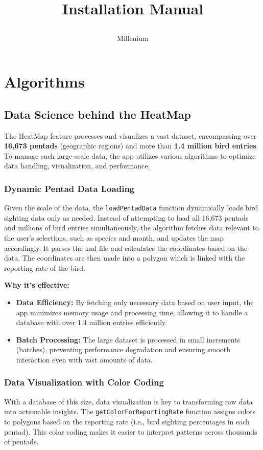 \documentclass{article}
\title{

\\
{Installation Manual}
}
\author{Millenium}
\begin{document}
\tableofcontents

\newpage

\section{Algorithms}
\subsection{Data Science behind the HeatMap}

The HeatMap feature processes and visualizes a vast dataset, encompassing over \textbf{16,673 pentads} (geographic regions) and more than \textbf{1.4 million bird entries}. To manage such large-scale data, the app utilizes various algorithms to optimize data handling, visualization, and performance.

\subsubsection{Dynamic Pentad Data Loading}
Given the scale of the data, the \texttt{loadPentadData} function dynamically loads bird sighting data only as needed. Instead of attempting to load all 16,673 pentads and millions of bird entries simultaneously, the algorithm fetches data relevant to the user's selections, such as species and month, and updates the map accordingly. It parses the kml file and calculates the coordinates based on the data. The coordinates are then made into a polygon which is linked with the reporting rate of the bird. 

\textbf{Why it's effective:}
\begin{itemize}
    \item \textbf{Data Efficiency:} By fetching only necessary data based on user input, the app minimizes memory usage and processing time, allowing it to handle a database with over 1.4 million entries efficiently.
    \item \textbf{Batch Processing:} The large dataset is processed in small increments (batches), preventing performance degradation and ensuring smooth interaction even with vast amounts of data.
\end{itemize}

\subsubsection{Data Visualization with Color Coding}
With a database of this size, data visualization is key to transforming raw data into actionable insights. The \texttt{getColorForReportingRate} function assigns colors to polygons based on the reporting rate (i.e., bird sighting percentages in each pentad). This color coding makes it easier to interpret patterns across thousands of pentads.
\end{document}
